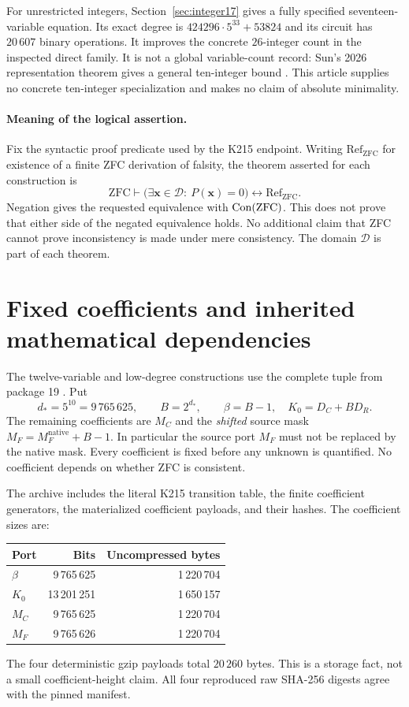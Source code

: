 \documentclass[11pt]{article}
\theoremstyle{remark}\newtheorem{remark}[theorem]{Remark}
\begin{document}
For unrestricted integers, Section~\ref{sec:integer17} gives a fully specified
seventeen-variable equation. Its exact degree is
$424296\cdot5^{33}+53824$ and its circuit has $20\,607$ binary operations.
It improves the concrete $26$-integer count in the inspected direct family.
It is not a global variable-count record: Sun's 2026 representation theorem
gives a general ten-integer bound \cite{sun2026}. This article supplies no
concrete ten-integer specialization and makes no claim of absolute minimality.

\paragraph{Meaning of the logical assertion.}
Fix the syntactic proof predicate used by the K215 endpoint. Writing
$\mathrm{Ref}_{\mathrm{ZFC}}$ for existence of a finite ZFC derivation of
falsity, the theorem asserted for each construction is
\[
 \mathrm{ZFC}\vdash
 \bigl(\exists\mathbf x\in\mathcal D:\ P(\mathbf x)=0\bigr)
 \longleftrightarrow\mathrm{Ref}_{\mathrm{ZFC}}.
\]
Negation gives the requested equivalence with $\operatorname{Con}(\mathrm{ZFC})$.
This does not prove that either side of the negated equivalence holds.
No additional claim that ZFC cannot prove inconsistency is made under
mere consistency. The domain $\mathcal D$ is part of each theorem.

\section{Fixed coefficients and inherited mathematical dependencies}
\label{sec:coefficients}

The twelve-variable and low-degree constructions use the complete
 tuple from package 19 \cite{wang943}. Put
\[
 d_\ast=5^{10}=9\,765\,625,\qquad B=2^{d_\ast},\qquad
 \beta=B-1,\quad K_0=D_C+BD_R.
\]
The remaining coefficients are $M_C$ and the \emph{shifted} source mask
$M_F=M_F^{\mathrm{native}}+B-1$. In particular the source port $M_F$
must not be replaced by the native mask. Every coefficient is fixed before
any unknown is quantified. No coefficient depends on whether ZFC is consistent.

The archive includes the literal K215 transition table, the finite coefficient
generators, the materialized coefficient payloads, and their hashes. The
coefficient sizes are:
\begin{center}
\begin{tabular}{@{}lrr@{}}\toprule
Port & Bits & Uncompressed bytes\\\midrule
$\beta$&9\,765\,625&1\,220\,704\\
$K_0$&13\,201\,251&1\,650\,157\\
$M_C$&9\,765\,625&1\,220\,704\\
$M_F$&9\,765\,626&1\,220\,704\\\bottomrule
\end{tabular}
\end{center}
The four deterministic gzip payloads total $20\,260$ bytes. This is a storage
fact, not a small coefficient-height claim. All four reproduced raw SHA-256
digests agree with the pinned manifest.
\end{document}
